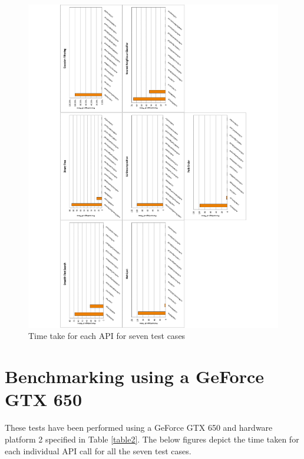 \documentclass[paper=a4, fontsize=11pt]{scrartcl}
\numberwithin{equation}{section}		%
\numberwithin{figure}{section}			%
\numberwithin{table}{section}				%
\begin{document}
\begin{figure}[!h]
\centering
\includegraphics[scale=0.6]{../imgs/x630.pdf}
\caption{Time take for each API for seven test cases}
\label{fig:x630}
\end{figure}




\newpage
\section{Benchmarking using a GeForce GTX 650}
These tests have been performed using a GeForce GTX 650 and hardware platform 2 specified in Table \ref{table2}. The below figures depict the time taken for each individual API call for all the seven test cases.
\end{document}
